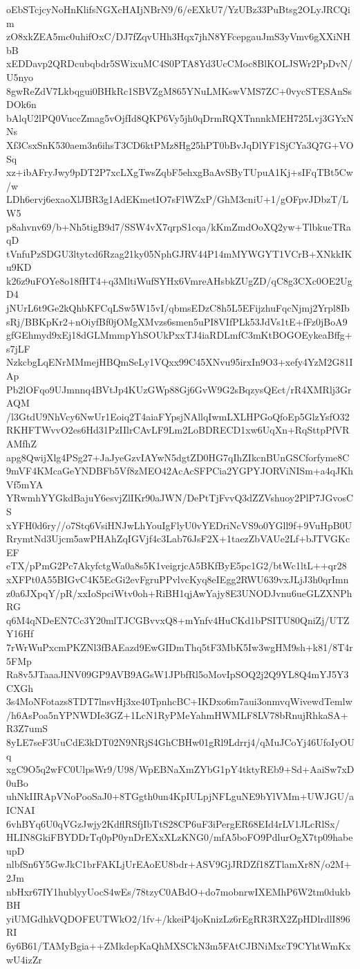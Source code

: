 oEbSTcjcyNoHnKlifsNGXcHAIjNBrN9/6/eEXkU7/YzUBz33PuBtsg2OLyJRCQim
zO8xkZEA5mc0uhifOxC/DJ7fZqvUHh3Hqx7jhN8YFcepgauJmS3yVmv6gXXiNHbB
xEDDavp2QRDcubqbdr5SWixuMC4S0PTA8Yd3UcCMoc8BlKOLJSWr2PpDvN/U5nyo
8gwReZdV7Lkbqgui0BHkRc1SBVZgM865YNuLMKswVMS7ZC+0vycSTESAnSsDOk6n
bAlqU2lPQ0VuccZmag5vOjfId8QKP6Vy5jh0qDrmRQXTnnnkMEH725Lvj3GYxNNs
Xf3CsxSnK530aem3n6ihsT3CD6ktPMz8Hg25hPT0bBvJqDlYF1SjCYa3Q7G+VOSq
xz+ibAFryJwy9pDT2P7xcLXgTwsZqbF5ehxgBaAvSByTUpuA1Kj+sIFqTBt5Cw/w
LDh6ervj6exaoXlJBR3g1AdEKmetIO7sFlWZxP/GhM3cniU+1/gOFpvJDbzT/LW5
p8ahvnv69/b+Nh5tigB9d7/SSW4vX7qrpS1cqa/kKmZmdOoXQ2yw+TlbkueTRaqD
tVnfuPzSDGU3ltytcd6Rzag21ky05NphGJRV44P14mMYWGYT1VCrB+XNkkIKu9KD
k26z9uFOYe8o18fHT4+q3MltiWufSYHx6VmreAHsbkZUgZD/qC8g3CXc0OE2UgD4
jNUrL6t9Ge2kQhbKFCqLSw5W15vI/qbmsEDzC8h5L5EFijzhuFqcNjmj2Yrpl8Ib
sRj/BBKpKr2+nOiyfBf0jOMgXMvzs6smen5uPI8VIfPLk53JdVs1tE+fFz0jBoA9
gfGEhmyd9xEj18dGLMmmpYhSOUkPxxTJ4iaRDLmfC3mKtBOGOEykeaBffg+s7jLF
NzkcbgLqENrMMmejHBQmSeLy1VQxx99C45XNvu95irxIn9O3+xefy4YzM2G81IAp
Pb2lOFqo9UJmnnq4BVtJp4KUzGWp88Gj6GvW9G2sBqzysQEct/rR4XMRlj3GrAQM
/l3GtdU9NhVcy6NwUr1Eoiq2T4aiaFYpsjNAllqIwmLXLHPGoQfoEp5GlzYsfO32
RKHFTWvvO2es6Hd31PzIIlrCAvLF9Lm2LoBDRECD1xw6UqXn+RqSttpPfVRAMfhZ
apg8QwijXlg4PSg27+JaJyeGzvIAYwN5dgtZD0HG7qIhZIkcnBUnGSCforfyme8C
9mVF4KMcaGeYNDBFb5Vf8zMEO42AcAcSFPCia2YGPYJORViNISm+a4qJKhVf5mYA
YRwmhYYGkdBajuY6esvjZlIKr90aJWN/DePtTjFvvQ3dZZVshuoy2PlP7JGvosCS
xYFH0d6ry//o7Stq6VsiHNJwLhYouIgFlyU0vYEDriNcVS9o0YGll9f+9VuHpB0U
RrymtNd3Ujcm5awPHAhZqIGVjf4c3Lab76JsF2X+1taezZbVAUe2Lf+bJTVGKcEF
eTX/pPmG2Pc7AkyfctgWa0a8s5K1veigrjcA5BKfByE5pc1G2/btWc1ltL++qr28
xXFPt0A55BIGvC4K5EcGi2evFgruPPvlvcKyq8eIEgg2RWU639vxJLjJ3h0qrImn
z0a6JXpqY/pR/xxIoSpciWtv0oh+RiBH1qjAwYajy8E3UNODJvnu6ueGLZXNPhRG
q6M4qNDeEN7Cc3Y20mlTJCGBvvxQ8+mYnfv4HuCKd1bPSITU80QniZj/UTZY16Hf
7rWrWuPxcmPKZNl3fBAEazd9EwGIDmThq5tF3MbK5Iw3wgHM9sh+k81/8T4r5FMp
Ra8v5JTaaaJINV09GP9AVB9AGsW1JPbfRl5oMovIpSOQ2j2Q9YL8Q4mYJ5Y3CXGh
3s4MoNFotazs8TDT7lnsvHj3xe40TpnhcBC+IKDxo6m7aui3onmvqWivewdTemlw
/h6AsPoa5nYPNWDIe3GZ+1LcN1RyPMeYahmHWMLF8LV78bRnujRhkaSA+R3Z7umS
8yLE7seF3UuCdE3kDT02N9NRjS4GhCBHw01gRl9Ldrrj4/qMuJCoYj46UfoIyOUq
xgC9O5q2wFC0UlpsWr9/U98/WpEBNaXmZYbG1pY4tktyREb9+Sd+AaiSw7xD0uBo
uhNkIIRApVNoPooSaJ0+8TGgth0un4KpIULpjNFLguNE9bYlVMm+UWJGU/aICNAI
6vhBYq6U0qVGzJwjy2KdflRSfjIbTtS28CP6uF3iPergER68EId4rLV1JLcRlSx/
HLIN8GkiFBYDDrTq0pP0ynDrEXxXLzKNG0/mfA5boFO9PdlurOgX7tp09habeupD
nlbfSn6Y5GwJkC1brFAKLjUrEAoEU8bdr+ASV9GjJRDZf18ZTlamXr8N/o2M+2Jm
nbHxr67IY1hublyyUocS4wEs/78tzyC0ABdO+do7mobnrwIXEMhP6W2tm0dukbBH
yiUMGdhkVQDOFEUTWkO2/1fv+/kkeiP4joKnizLz6rEgRR3RX2ZpHDlrdlI896RI
6y6B61/TAMyBgia++ZMkdepKaQhMXSCkN3m5FAtCJBNiMxcT9CYhtWmKxwU4izZr
